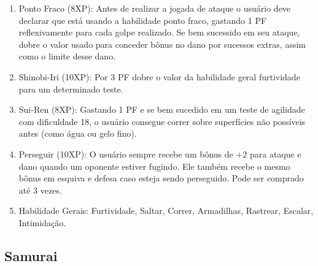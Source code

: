 \begin{enumerate}
	\item Ponto Fraco (8XP): Antes de realizar a jogada de ataque o usuário deve declarar que está usando a habilidade ponto fraco, gastando 1 PF reflexivamente para cada golpe realizado. Se bem sucessido em seu ataque, dobre o valor usado para conceder bônus no dano por sucessos extras, assim como o limite desse dano.	
	
	\item Shinobi-Iri (10XP): Por 3 PF dobre o valor da habilidade geral furtividade para um determinado teste.
	
	\item Sui-Ren (8XP): Gastando 1 PF e se bem sucedido em um teste de agilidade com dificuldade 18, o usuário consegue correr sobre superfícies não possíveis antes (como água ou gelo fino). 
	
	\item Perseguir (10XP): O usuário sempre recebe um bônus de +2 para ataque e dano quando um oponente estiver fugindo. Ele também recebe o mesmo bônus em esquiva e defesa caso esteja sendo perseguido. Pode ser comprado até 3 vezes.
	
	
	\item Habilidade Gerais: Furtividade, Saltar, Correr, Armadilhas, Rastrear, Escalar, Intimidação.
	
	
\end{enumerate}

 \subsection{Samurai} 
 
